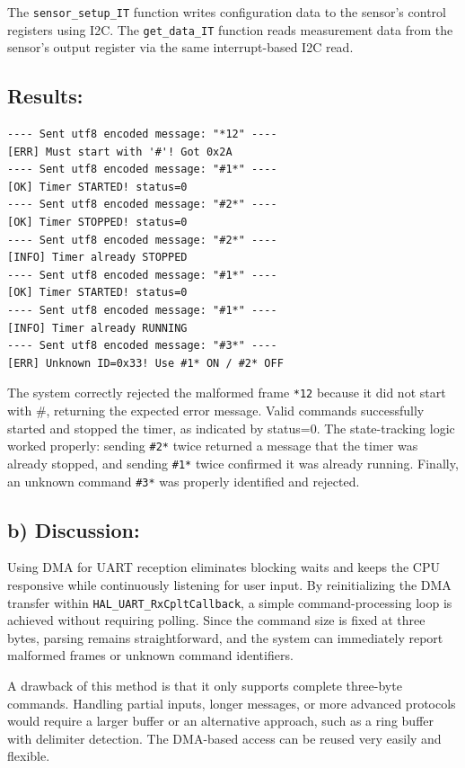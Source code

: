 The \texttt{sensor\_setup\_IT} function writes configuration data to the sensor's control registers using I2C. The \texttt{get\_data\_IT} function reads measurement data from the sensor's output register via the same interrupt-based I2C read.

\subsection*{Results:}

\begin{lstlisting}[numbers=none, caption={Timer control commands using UART}, captionpos=b]
---- Sent utf8 encoded message: "*12" ----
[ERR] Must start with '#'! Got 0x2A
---- Sent utf8 encoded message: "#1*" ----
[OK] Timer STARTED! status=0
---- Sent utf8 encoded message: "#2*" ----
[OK] Timer STOPPED! status=0
---- Sent utf8 encoded message: "#2*" ----
[INFO] Timer already STOPPED
---- Sent utf8 encoded message: "#1*" ----
[OK] Timer STARTED! status=0
---- Sent utf8 encoded message: "#1*" ----
[INFO] Timer already RUNNING
---- Sent utf8 encoded message: "#3*" ----
[ERR] Unknown ID=0x33! Use #1* ON / #2* OFF
\end{lstlisting}


The system correctly rejected the malformed frame \texttt{*12} because it did not start with \#, returning the expected error message. Valid commands successfully started and stopped the timer, as indicated by status=0. The state-tracking logic worked properly: sending \texttt{\#2*} twice returned a message that the timer was already stopped, and sending \texttt{\#1*} twice confirmed it was already running. Finally, an unknown command \texttt{\#3*} was properly identified and rejected.

\subsection{b) Discussion:}

Using DMA for UART reception eliminates blocking waits and keeps the CPU responsive while continuously listening for user input. By reinitializing the DMA transfer within \texttt{HAL\_UART\_RxCpltCallback}, a simple command-processing loop is achieved without requiring polling. Since the command size is fixed at three bytes, parsing remains straightforward, and the system can immediately report malformed frames or unknown command identifiers.

A drawback of this method is that it only supports complete three-byte commands. Handling partial inputs, longer messages, or more advanced protocols would require a larger buffer or an alternative approach, such as a ring buffer with delimiter detection. 
The DMA-based access can be reused very easily and flexible.